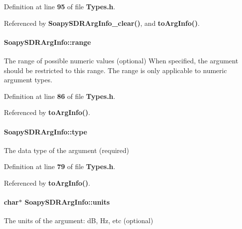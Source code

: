 Definition at line {\bf 95} of file {\bf Types.\+h}.



Referenced by {\bf Soapy\+S\+D\+R\+Arg\+Info\+\_\+clear()}, and {\bf to\+Arg\+Info()}.

\paragraph[{range}]{ Soapy\+S\+D\+R\+Arg\+Info\+::range}\label{structSoapySDRArgInfo_a5c595fc875042a1fe2122081f2b424ed}
The range of possible numeric values (optional) When specified, the argument should be restricted to this range. The range is only applicable to numeric argument types. 

Definition at line {\bf 86} of file {\bf Types.\+h}.



Referenced by {\bf to\+Arg\+Info()}.

\paragraph[{type}]{ Soapy\+S\+D\+R\+Arg\+Info\+::type}\label{structSoapySDRArgInfo_a1a36d752e73cc4535e4cb1f5f78af812}


The data type of the argument (required) 



Definition at line {\bf 79} of file {\bf Types.\+h}.



Referenced by {\bf to\+Arg\+Info()}.

\paragraph[{units}]{\setlength{\rightskip}{0pt plus 5cm}char$\ast$ Soapy\+S\+D\+R\+Arg\+Info\+::units}\label{structSoapySDRArgInfo_ae34b1e88045abea67ed77cb57c4c7483}


The units of the argument\+: dB, Hz, etc (optional) 



